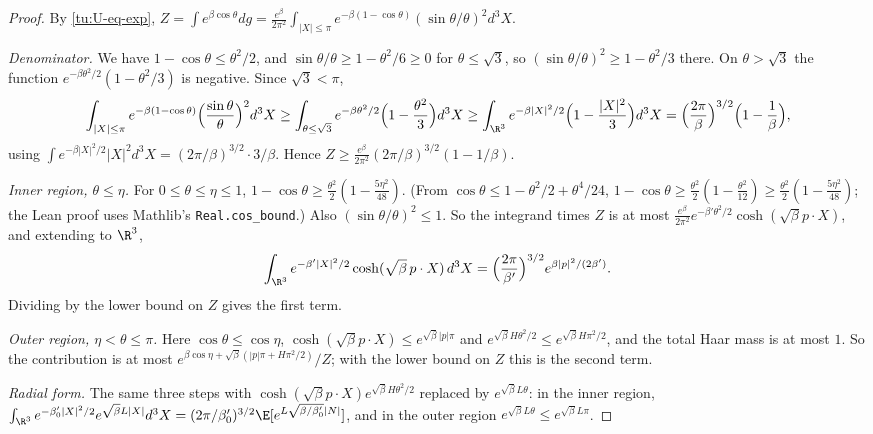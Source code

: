 \begin{proof}
By \eqref{tu:U-eq-exp}, $Z=\int e^{\beta\cos\theta}dg=\frac{e^\beta}{2\pi^2}\int_{|X|\le\pi}e^{-\beta(1-\cos\theta)}(\sin\theta/\theta)^2d^3X$.

\emph{Denominator.} We have $1-\cos\theta\le\theta^2/2$, and $\sin\theta/\theta\ge1-\theta^2/6\ge0$ for
$\theta\le\sqrt3$, so $(\sin\theta/\theta)^2\ge1-\theta^2/3$ there. On $\theta>\sqrt3$ the function
$e^{-\beta\theta^2/2}(1-\theta^2/3)$ is negative. Since $\sqrt3<\pi$,
\[
\int_{|X|\le\pi}e^{-\beta(1-\cos\theta)}\Bigl(\frac{\sin\theta}\theta\Bigr)^2d^3X\ge\int_{\theta\le\sqrt3}e^{-\beta\theta^2/2}\Bigl(1-\frac{\theta^2}3\Bigr)d^3X
\ge\int_{\R^3}e^{-\beta|X|^2/2}\Bigl(1-\frac{|X|^2}3\Bigr)d^3X=\Bigl(\frac{2\pi}{\beta}\Bigr)^{3/2}\Bigl(1-\frac1\beta\Bigr),
\]
using $\int e^{-\beta|X|^2/2}|X|^2d^3X=(2\pi/\beta)^{3/2}\cdot3/\beta$. Hence
$Z\ge\frac{e^\beta}{2\pi^2}(2\pi/\beta)^{3/2}(1-1/\beta)$.

\emph{Inner region, $\theta\le\eta$.} For $0\le\theta\le\eta\le1$,
$1-\cos\theta\ge\frac{\theta^2}2(1-\frac{5\eta^2}{48})$. (From $\cos\theta\le1-\theta^2/2+\theta^4/24$,
$1-\cos\theta\ge\frac{\theta^2}{2}(1-\frac{\theta^2}{12})\ge\frac{\theta^2}{2}(1-\frac{5\eta^2}{48})$; the
Lean proof uses Mathlib's \texttt{Real.cos\_bound}.) Also $(\sin\theta/\theta)^2\le1$. So the integrand
times $Z$ is at most $\frac{e^\beta}{2\pi^2}e^{-\beta'\theta^2/2}\cosh(\sqrt\beta p\cdot X)$, and extending to
$\R^3$,
\[
\int_{\R^3}e^{-\beta'|X|^2/2}\cosh(\sqrt\beta\,p\cdot X)\,d^3X=\Bigl(\frac{2\pi}{\beta'}\Bigr)^{3/2}e^{\beta|p|^2/(2\beta')}.
\]
Dividing by the lower bound on $Z$ gives the first term.

\emph{Outer region, $\eta<\theta\le\pi$.} Here $\cos\theta\le\cos\eta$, $\cosh(\sqrt\beta p\cdot X)\le e^{\sqrt\beta|p|\pi}$
and $e^{\sqrt\beta H\theta^2/2}\le e^{\sqrt\beta H\pi^2/2}$, and the total Haar mass is at most $1$. So
the contribution is at most $e^{\beta\cos\eta+\sqrt\beta(|p|\pi+H\pi^2/2)}/Z$; with the lower bound on $Z$ this
is the second term.

\emph{Radial form.} The same three steps with $\cosh(\sqrt\beta p\cdot X)e^{\sqrt\beta H\theta^2/2}$ replaced by
$e^{\sqrt\beta L\theta}$: in the inner region,
$\int_{\R^3}e^{-\beta_0'|X|^2/2}e^{\sqrt\beta L|X|}d^3X=(2\pi/\beta_0')^{3/2}\E[e^{L\sqrt{\beta/\beta_0'}|N|}]$,
and in the outer region $e^{\sqrt\beta L\theta}\le e^{\sqrt\beta L\pi}$.
\end{proof}

